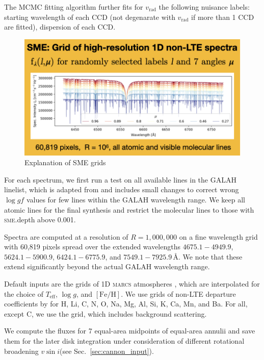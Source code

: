 \documentclass[
  journal=pasa,
  manuscript=research-paper, %
  year=2021,
  volume=37,
]{cup-journal}
\newcommand{\Teff}{$T_\mathrm{eff}$\xspace}
\newcommand{\logg}{$\log g$\xspace}
\newcommand{\feh}{$\mathrm{[Fe/H]}$\xspace}
\newcommand{\vsini}{$v \sin i$\xspace}
\newcommand{\vrad}{$v_\mathrm{rad}$\xspace}
\newcommand{\marcs}{\textsc{marcs}\xspace}
\newcommand{\Angstroem}{\,\text{\AA}}	%
\begin{document}
The MCMC fitting algorithm further fits for \vrad the following nuisance labels: starting wavelength of each CCD (not degenarate with \vrad if more than 1 CCD are fitted), dispersion of each CCD.

\begin{figure}[hbt!]
 \centering
 \includegraphics[width=\columnwidth]{figures/sme_grid.png}
 \caption{Explanation of SME grids}
 \label{fig:sme_grid}
\end{figure}

For each spectrum, we first run a test on all available lines in the GALAH linelist, which is adapted from \citet{Heiter2021} and includes small changes to correct wrong $\log gf$ values for few lines within the GALAH wavelength range. We keep all atomic lines for the final synthesis and restrict the molecular lines to those with \textsc{sme}.depth above 0.001.

Spectra are computed at a resolution of $R = 1,000,000$ on a fine wavelength grid with 60,819 pixels spread over the extended wavelengths $4675.1- 4949.9$, $5624.1-5900.9$, $6424.1-6775.9$, and $7549.1-7925.9 \Angstroem$. We note that these extend significantly beyond the actual GALAH wavelength range.

Default inputs are the grids of 1D \marcs atmospheres \citep[][version 2014]{Gustafsson2008}, which are interpolated for the choice of \Teff, \logg, and \feh. We use grids of non-LTE departure coefficients by \citet{Amarsi2020} for H, Li, C, N, O, Na, Mg, Al, Si, K, Ca, Mn, and Ba. For all, except C, we use the grid, which includes background scattering.

We compute the fluxes for 7 equal-area midpoints of equal-area annulii and save them for the later disk integration under consideration of different rotational broadening \vsini (see Sec.~\ref{sec:cannon_input}).
\end{document}
